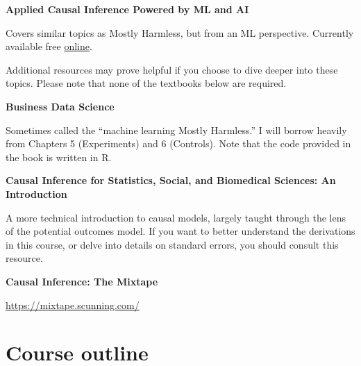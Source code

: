 \documentclass[11 pt]{article}
\begin{document}
\textbf{Applied Causal Inference Powered by ML and AI}
\parencite{CHKSS25}
\begin{blist}
\item Covers similar topics as Mostly Harmless, but from an ML perspective. Currently available free \href{https://causalml-book.org/}{online}. 
\end{blist}


Additional resources may prove helpful if you choose to dive deeper into these topics. 
Please note that none of the textbooks below are required.

\textbf{Business Data Science} \parencite{T19}
\begin{blist}
\item Sometimes called the ``machine learning Mostly Harmless.'' I will borrow heavily from Chapters 5 (Experiments) and 6 (Controls). Note that the code provided in the book is written in R. 
\end{blist}

\textbf{Causal Inference for Statistics, Social, and Biomedical Sciences: An Introduction} \parencite{IR15}
\begin{blist}
\item A more technical introduction to causal models, largely taught through the lens of the potential outcomes model. If you want to better understand the derivations in this course, or delve into details on standard errors, you should consult this resource.
\end{blist}

\textbf{Causal Inference: The Mixtape} \parencite{C25}
\begin{blist}
\item \url{https://mixtape.scunning.com/}
\end{blist}
\section*{Course outline}
\end{document}
